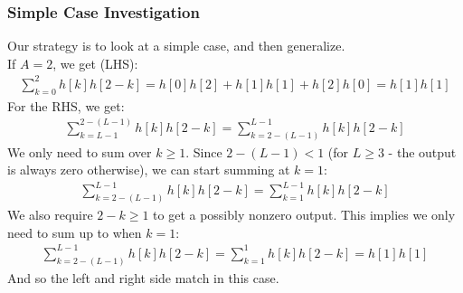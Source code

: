 \subsubsection*{Simple Case Investigation}
Our strategy is to look at a simple case, and then generalize. \\
If $A = 2$, we get (LHS):
\begin{align*}
\sum_{k=0}^{2}h[k]h[2-k] = h[0]h[2] + h[1]h[1] + h[2]h[0] = h[1]h[1]
\end{align*}
For the RHS, we get:
\begin{align*}
\sum_{k=L-1}^{2-(L-1)}h[k]h[2-k] = \sum_{k=2-(L-1)}^{L-1}h[k]h[2-k]
\end{align*}
We only need to sum over $k \geq 1$. Since $2-(L-1) < 1$ (for $L \geq 3$ - the output is always zero otherwise), we can start summing at $k = 1$:
\begin{align*}
\sum_{k=2-(L-1)}^{L-1}h[k]h[2-k] = \sum_{k=1}^{L-1}h[k]h[2-k]
\end{align*}
We also require $2-k \geq 1$ to get a possibly nonzero output. This implies we only need to sum up to when $k = 1$:
\begin{align*}
\sum_{k=2-(L-1)}^{L-1}h[k]h[2-k] = \sum_{k=1}^{1}h[k]h[2-k] = h[1]h[1]
\end{align*}
And so the left and right side match in this case.
\clearpage
